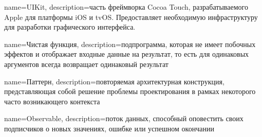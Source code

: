 

{
  name={UIKit},
  description={часть фреймворка Cocoa Touch, разрабатываемого Apple для платформы iOS и tvOS. Предоставляет необходимую инфраструктуру для разработки графического интерфейса.}
}

{
  name={Чистая функция},
  description={подпрограмма, которая не имеет побочных эффектов и отображает входные данные на результат, то есть для одинаковых аргументов всегда возвращает одинаковый результат}
}

{
  name={Паттерн},
  description={повторяемая архитектурная конструкция, представляющая собой решение проблемы проектирования в рамках некоторого часто возникающего контекста}
}

{
  name=Observable,
  description={поток данных, способный оповестить своих подписчиков о новых значениях, ошибке или успешном окончании}
}

\glsaddall